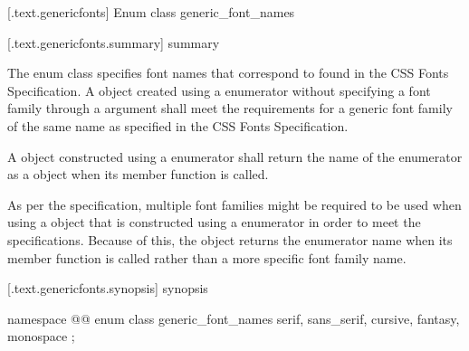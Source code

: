 
 [\iotwod.text.genericfonts] {Enum class generic_font_names}

 [\iotwod.text.genericfonts.summary] { summary}

\pnum
The  enum class specifies font names that correspond to  found in the CSS Fonts Specification. A  object created using a  enumerator without specifying a font family through a  argument shall meet the requirements for a generic font family of the same name as specified in the CSS Fonts Specification.

\pnum
A  object constructed using a  enumerator shall return the name of the enumerator as a  object when its  member function is called.

\pnum
\begin{note}
As per the specification, multiple font families might be required to be used when using a  object that is constructed using a  enumerator in order to meet the specifications. Because of this, the  object returns the enumerator name when its  member function is called rather than a more specific font family name.
\end{note}

 [\iotwod.text.genericfonts.synopsis] { synopsis}

%
\begin{codeblock}
namespace @\fullnamespace{}@ {
  enum class generic_font_names {
    serif,
    sans_serif,
    cursive,
    fantasy,
    monospace
  };
}
\end{codeblock}

